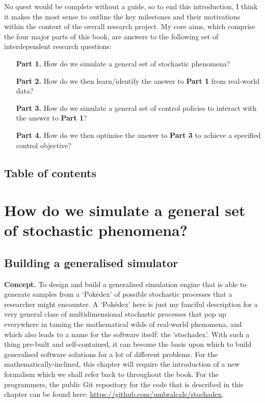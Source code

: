 \documentclass{book}
\begin{document}
No quest would be complete without a guide, so to end this introduction, I think it makes the most sense to outline the key milestones and their motivations within the context of the overall research project. My core aims, which comprise the four major parts of this book, are answers to the following set of interdependent research questions:

\begin{enumerate}[leftmargin=2.5\parindent] 
\item[{\bfseries\sffamily Part 1.}]{How do we simulate a general set of stochastic phenomena?}
\item[{\bfseries\sffamily Part 2.}]{How do we then learn/identify the answer to {\bfseries\sffamily Part 1} from real-world data?}
\item[{\bfseries\sffamily Part 3.}]{How do we simulate a general set of control policies to interact with the answer to {\bfseries\sffamily Part 1}?}
\item[{\bfseries\sffamily Part 4.}]{How do we then optimise the answer to {\bfseries\sffamily Part 3} to achieve a specified control objective?} 
\end{enumerate}



\chapter*{Table of contents}
\vspace*{-3cm}
{\sffamily \tableofcontents}
\mainmatter


\part*{{ How do we simulate a general set of stochastic phenomena?}}


\chapter{\sffamily Building a generalised simulator}

{\bfseries\sffamily Concept.} To design and build a generalised simulation engine that is able to generate samples from a `Pokédex' of possible stochastic processes that a researcher might encounter. A `Pokédex' here is just my fanciful description for a very general class of multidimensional stochastic processes that pop up everywhere in taming the mathematical wilds of real-world phenomena, and which also leads to a name for the software itself: the `stochadex'. With such a thing pre-built and self-contained, it can become the basis upon which to build generalised software solutions for a lot of different problems. For the mathematically-inclined, this chapter will require the introduction of a new formalism which we shall refer back to throughout the book. For the programmers, the public Git repository for the code that is described in this chapter can be found here: \href{https://github.com/umbralcalc/stochadex}{https://github.com/umbralcalc/stochadex}.
\end{document}
